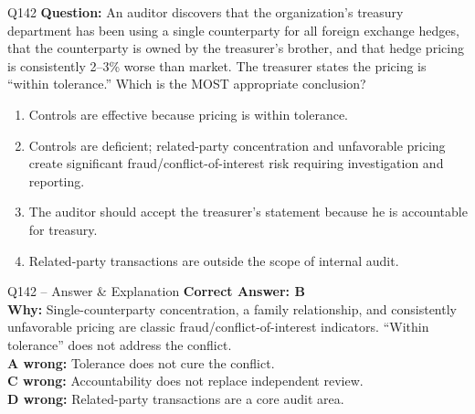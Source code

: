 \documentclass[aspectratio=169,10pt]{beamer}
\begin{document}
	\begin{frame}[t]{Q142}
		\small
		\textbf{Question:} An auditor discovers that the organization's treasury department has been using a single counterparty for all foreign exchange hedges, that the counterparty is owned by the treasurer's brother, and that hedge pricing is consistently 2--3\% worse than market. The treasurer states the pricing is ``within tolerance.'' Which is the MOST appropriate conclusion?
		\begin{enumerate}[label=\Alph*.,itemsep=1pt,topsep=2pt]
			\item Controls are effective because pricing is within tolerance.
			\item Controls are deficient; related-party concentration and unfavorable pricing create significant fraud/conflict-of-interest risk requiring investigation and reporting.
			\item The auditor should accept the treasurer's statement because he is accountable for treasury.
			\item Related-party transactions are outside the scope of internal audit.
		\end{enumerate}
	\end{frame}
	
	\begin{frame}[t]{Q142 -- Answer \& Explanation}
		\small
		\textbf{Correct Answer: B} \\[4pt]
		\textbf{Why:} Single-counterparty concentration, a family relationship, and consistently unfavorable pricing are classic fraud/conflict-of-interest indicators. ``Within tolerance'' does not address the conflict. \\[4pt]
		\textbf{A wrong:} Tolerance does not cure the conflict. \\[2pt]
		\textbf{C wrong:} Accountability does not replace independent review. \\[2pt]
		\textbf{D wrong:} Related-party transactions are a core audit area.
	\end{frame}
	
\end{document}
